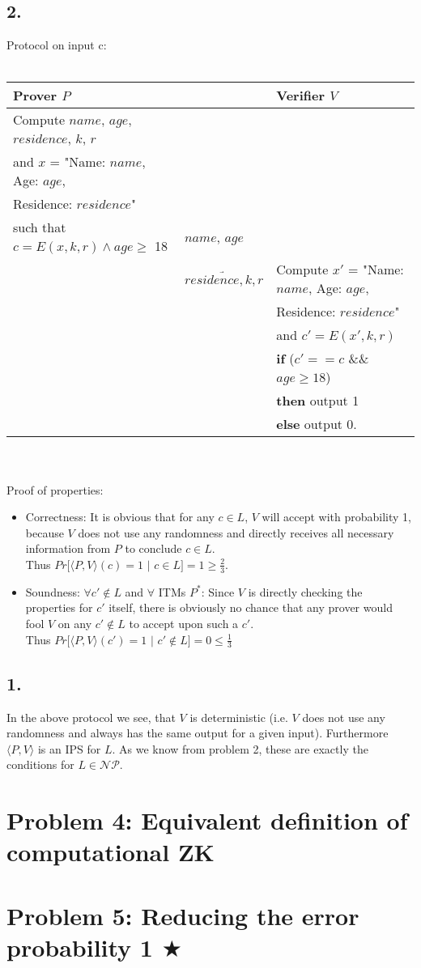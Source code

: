 \documentclass[12pt,pdftex,a4paper]{article}
\begin{document}
\subsection*{2.}
Protocol on input c:
\\~\\
\footnotesize
\begin{tabular}{lll}
Prover $P$ && Verifier $V$\\
\hline
Compute $name$, $age$, $residence$, $k$, $r$ 
\\and $x$ = "Name: $name$, Age: $age$, \\
Residence: $residence$"\\
such that $c = E(x, k, r) \land age \geq$ 18 & $name$, $age$\\
&$\underrightarrow{residence, k, r}$ & Compute $x'$ = "Name: $name$, Age: $age$, \\
&&Residence: $residence$"\\
&& and $c' = E(x', k, r)$\\
&& \textbf{if} ($c' == c$ \&\& $age \geq 18$)\\
&& \textbf{then} output 1\\
&& \textbf{else} output 0.\\
\end{tabular}\\~\\
\normalsize
Proof of properties:
\begin{itemize}
\item Correctness: It is obvious that for any $c \in L$, $V$ will accept with probability 1, because $V$ does not use any randomness and directly receives all necessary information from $P$ to conclude $c\in L$.\\Thus $Pr[\langle P, V\rangle (c)=1$ $|$ $c\in L] = 1 \geq \frac{2}{3}$.
\item Soundness: $\forall c'\notin L$ and $\forall$ ITMs $P^*$: Since $V$ is directly checking the properties for $c'$ itself, there is obviously no chance that any prover would fool $V$ on any $c'\notin L$ to accept upon such a $c'$.\\Thus $Pr[\langle P, V\rangle (c') = 1$ $|$ $c'\notin L] = 0 \leq \frac{1}{3}$
\end{itemize}

\subsection*{1.}
In the above protocol we see, that $V$ is deterministic (i.e. $V$ does not use any randomness and always has the same output for a given input). Furthermore $\langle P, V \rangle$ is an IPS for $L$. As we know from problem 2, these are exactly the conditions for $L\in \mathcal{NP}$.

\section*{Problem 4: Equivalent definition of computational ZK}

\section*{Problem 5: Reducing the error probability 1 $\bigstar$}
\end{document}
